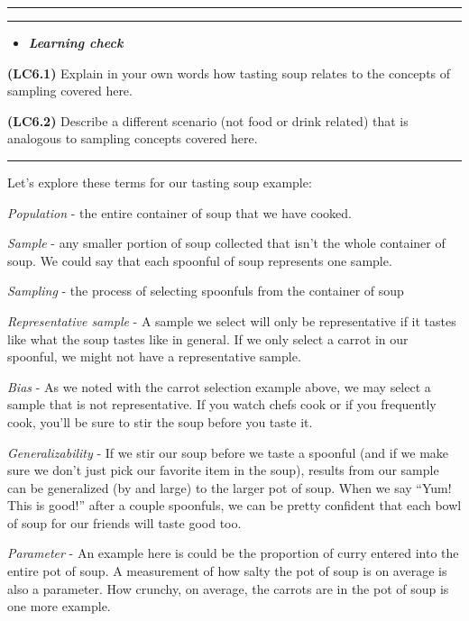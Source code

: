 \documentclass[]{tufte-book}
\let\oldrule=\rule
\renewcommand{\rule}[1]{\oldrule{\linewidth}}
\newenvironment{rmdblock}[1]
  {\begin{shaded*}
  \begin{itemize}
  \renewcommand{\labelitemi}{
    \raisebox{-.7\height}[0pt][0pt]{
    }
  }
  \item
  }
  {
  \end{itemize}
  \end{shaded*}
  }
\newenvironment{learncheck}
  {\begin{rmdblock}{warning}}
  {\end{rmdblock}}
\begin{document}
\begin{center}\rule{0.5\linewidth}{\linethickness}\end{center}

\begin{center}\rule{0.5\linewidth}{\linethickness}\end{center}

\begin{learncheck}
\textbf{\emph{Learning check}}
\end{learncheck}

\textbf{(LC6.1)} Explain in your own words how tasting soup relates to
the concepts of sampling covered here.

\textbf{(LC6.2)} Describe a different scenario (not food or drink
related) that is analogous to sampling concepts covered here.

\begin{center}\rule{0.5\linewidth}{\linethickness}\end{center}

Let's explore these terms for our tasting soup example:

\emph{Population} - the entire container of soup that we have cooked.

\emph{Sample} - any smaller portion of soup collected that isn't the
whole container of soup. We could say that each spoonful of soup
represents one sample.

\emph{Sampling} - the process of selecting spoonfuls from the container
of soup

\emph{Representative sample} - A sample we select will only be
representative if it tastes like what the soup tastes like in general.
If we only select a carrot in our spoonful, we might not have a
representative sample.

\emph{Bias} - As we noted with the carrot selection example above, we
may select a sample that is not representative. If you watch chefs cook
or if you frequently cook, you'll be sure to stir the soup before you
taste it.

\emph{Generalizability} - If we stir our soup before we taste a spoonful
(and if we make sure we don't just pick our favorite item in the soup),
results from our sample can be generalized (by and large) to the larger
pot of soup. When we say ``Yum! This is good!'' after a couple
spoonfuls, we can be pretty confident that each bowl of soup for our
friends will taste good too.

\emph{Parameter} - An example here is could be the proportion of curry
entered into the entire pot of soup. A measurement of how salty the pot
of soup is on average is also a parameter. How crunchy, on average, the
carrots are in the pot of soup is one more example.
\end{document}
